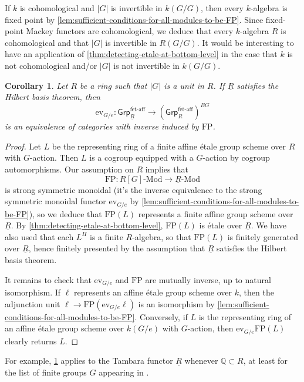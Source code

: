 \documentclass[11pt,dvipsnames]{amsart}
\newcommand{\Q}{\mathbb{Q}}
\newtheorem{corollary}[theorem]{Corollary}
\theoremstyle{BoldRemark}
\newcommand{\FP}{\mathrm{FP}}
\newcommand{\ev}{\mathrm{ev}}
\newcommand{\fet}{\mathsf{Grp}^{\mathrm{f\acute{e}t\text{-}aff}}}
\newcommand{\Mod}{\mathrm{Mod}}
\begin{document}
If $k$ is cohomological and $|G|$ is invertible in $k(G/G)$, then every $k$-algebra is fixed point by \cref{lem:sufficient-conditions-for-all-modules-to-be-FP}. Since fixed-point Mackey functors are cohomological, we deduce that every $k$-algebra $R$ is cohomological and that $|G|$ is invertible in $R(G/G)$. It would be interesting to have an application of \cref{thm:detecting-etale-at-bottom-level} in the case that $k$ is not cohomological and/or $|G|$ is not invertible in $k(G/G)$.

\begin{corollary}\label{cor:Theorem-Q}
	Let $R$ be a ring such that $|G|$ is a unit in $R$. If $\underline{R}$ satisfies the Hilbert basis theorem, then 
    \[ 
        \ev_{G/e} : \fet_{\underline{R}} \rightarrow (\fet_R)^{BG} 
    \] 
    is an equivalence of categories with inverse induced by $\FP$.
\end{corollary}

\begin{proof}
	Let $L$ be the representing ring of a finite affine \'{e}tale group scheme over $R$ with $G$-action. Then $L$ is a cogroup equipped with a $G$-action by cogroup automorphisms. Our assumption on $R$ implies that 
    \[ 
        \FP : R[G] \text{-} \Mod \rightarrow \underline{R} \text{-} \Mod 
    \] 
    is strong symmetric monoidal (it's the inverse equivalence to the strong symmetric monoidal functor $\ev_{G/e}$ by \cref{lem:sufficient-conditions-for-all-modules-to-be-FP}), so we deduce that $\FP(L)$ represents a finite affine group scheme over $\underline{R}$. By \cref{thm:detecting-etale-at-bottom-level}, $\FP(L)$ is \'{e}tale over $\underline{R}$. We have also used that each $L^H$ is a finite $R$-algebra, so that $\FP(L)$ is finitely generated over $\underline{R}$, hence finitely presented by the assumption that $\underline{R}$ satisfies the Hilbert basis theorem.
	
	It remains to check that $\ev_{G/e}$ and $\FP$ are mutually inverse, up to natural isomorphism. If $\ell$ represents an affine \'{e}tale group scheme over $k$, then the adjunction unit $\ell \rightarrow \FP(\ev_{G/e} \ell)$ is an isomorphism by \cref{lem:sufficient-conditions-for-all-modules-to-be-FP}. Conversely, if $L$ is the representing ring of an affine \'{e}tale group scheme over $k(G/e)$ with $G$-action, then $\ev_{G/e} \FP(L)$ clearly returns $L$.
\end{proof}

For example, \cref{cor:Theorem-Q} applies to the Tambara functor $\underline{R}$ whenever $\Q \subset R$, at least for the list of finite groups $G$ appearing in \cite[Theorem A]{Sun25}.
\end{document}
